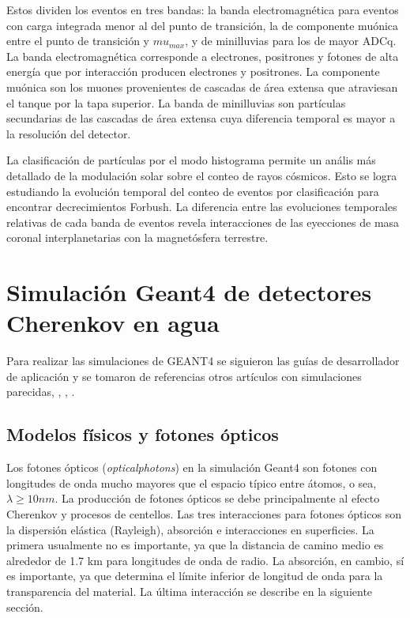 \documentclass{book}
\begin{document}
Estos dividen los eventos en tres bandas: la banda electromagn\'etica para eventos con carga integrada menor al del punto de transici\'on, la de componente mu\'onica entre el punto de transici\'on y $mu_{max}$, y de minilluvias para los de mayor ADCq. La banda electromagn\'etica corresponde a electrones, positrones y fotones de alta energ\'ia que por interacci\'on producen electrones y positrones. La componente mu\'onica son los muones provenientes de cascadas de \'area extensa que atraviesan el tanque por la tapa superior. La banda de minilluvias son part\'iculas secundarias de las cascadas de \'area extensa cuya diferencia temporal es mayor a la resoluci\'on del detector. \citep{PEREZ}

La clasificaci\'on de part\'iculas por el modo histograma permite un an\'alis m\'as detallado de la modulaci\'on solar sobre el conteo de rayos c\'osmicos. Esto se logra estudiando la evoluci\'on temporal del conteo de eventos por clasificaci\'on para encontrar decrecimientos Forbush. La diferencia entre las evoluciones temporales relativas de cada banda de eventos revela interacciones de las eyecciones de masa coronal interplanetarias con la magnet\'osfera terrestre. \citep{PEREZ}

\section{Simulaci\'on Geant4 de detectores Cherenkov en agua}

Para realizar las simulaciones de GEANT4 se siguieron las gu\'ias de desarrollador de aplicaci\'on y se tomaron de referencias otros art\'iculos con simulaciones parecidas, \citep{NIELSEN}, \citep{CHEN}, \citep{CALDERON}.

\subsection{Modelos f\'isicos y fotones \'opticos}
Los fotones \'opticos (\textit{opticalphotons}) en la simulaci\'on Geant4 son fotones con longitudes de onda mucho mayores que el espacio t\'ipico entre \'atomos, o sea, $\lambda\geq 10nm$. La producci\'on de fotones \'opticos se debe principalmente al efecto Cherenkov y procesos de centellos. Las tres interacciones para fotones \'opticos son la dispersi\'on el\'astica (Rayleigh), absorci\'on e interacciones en superficies. La primera usualmente no es importante, ya que la distancia de camino medio es alrededor de 1.7 km para longitudes de onda de radio. La absorci\'on, en cambio, s\'i es importante, ya que determina el l\'imite inferior de longitud de onda para la transparencia del material. La \'ultima interacci\'on se describe en la siguiente secci\'on.
\end{document}
